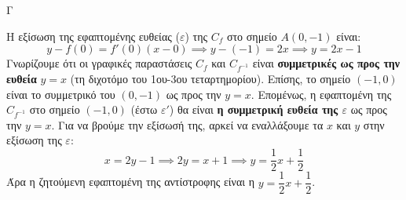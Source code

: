 \begin{thema}{Γ}
\begin{erwthma}
\item Η εξίσωση της εφαπτομένης ευθείας ($\varepsilon$) της $C_f$ στο σημείο $A(0, -1)$ είναι:
\[ y - f(0) = f'(0)(x - 0) \implies y - (-1) = 2x \implies y = 2x - 1 \]
Γνωρίζουμε ότι οι γραφικές παραστάσεις $C_f$ και $C_{f^{-1}}$ είναι \textbf{συμμετρικές ως προς την ευθεία} $y = x$ (τη διχοτόμο του 1ου-3ου τεταρτημορίου). Επίσης, το σημείο $(-1, 0)$ είναι το συμμετρικό του $(0, -1)$ ως προς την $y=x$.
Επομένως, η εφαπτομένη της $C_{f^{-1}}$ στο σημείο $(-1, 0)$ (έστω $\varepsilon'$) θα είναι \textbf{η συμμετρική ευθεία της $\varepsilon$} ως προς την $y = x$.
Για να βρούμε την εξίσωσή της, αρκεί να εναλλάξουμε τα $x$ και $y$ στην εξίσωση της $\varepsilon$:
\[ x = 2y - 1 \implies 2y = x + 1 \implies y = \frac{1}{2}x + \frac{1}{2} \]
Άρα η ζητούμενη εφαπτομένη της αντίστροφης είναι η ${y = \dfrac{1}{2}x + \dfrac{1}{2}}$.
\end{erwthma}
\end{thema}
